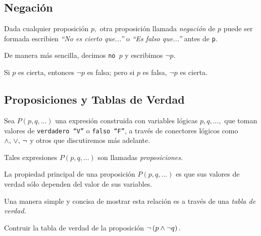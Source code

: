 \subsection{Negación}


 Dada cualquier proposición $p,$ otra proposición llamada \emph{negación} de $p$ puede ser formada escribien \emph{``No es cierto que...''} o \emph{``Es falso que...''} antes de \texttt{p}.
 
 De manera más sencilla, decimos \texttt{no $p$} y escribimos $\neg p.$
 
\begin{definicion}[Negación]
 Si $p$ es cierta, entonces $\neg p$ es falsa; pero si $p$ es falsa, $\neg p$ es cierta.
\end{definicion}
\subsection{Proposiciones y Tablas de Verdad}

 Sea $P(p,q,...)$ una expresión construida con variables lógicas $p,q,...,$ que toman valores de \texttt{verdadero ``V''} o \texttt{falso ``F''}, a través de conectores lógicos como $\wedge, \, \vee, \, \neg$ y otros  que discutiremos más adelante.
 
 Tales expresiones $P(p,q,...)$ son llamadas \emph{proposiciones.}

 La propiedad principal de una proposición $P(p,q,...)$ es que sus valores de verdad sólo dependen del valor de sus variables. 
 
 Una manera simple y concisa de mostrar esta relación es a través de una \emph{tabla de verdad.}

 \begin{problema}
  Contruir la tabla de verdad de la proposición
  $\neg \left( p \wedge \neg q \right).$

 \end{problema} 

